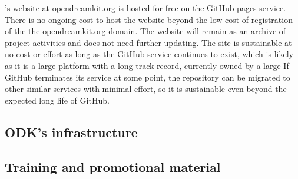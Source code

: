 \documentclass{deliverablereport}
\begin{document}
\ODK's website at opendreamkit.org is hosted for free on the GitHub-pages service.
There is no ongoing cost to host the website beyond the low cost of registration of the the opendreamkit.org domain.
The \ODK website will remain as an archive of project activities and does not need further updating.
The site is sustainable at no cost or effort as long as the GitHub service continues to exist,
which is likely as it is a large platform with a long track record, currently owned by a large
If GitHub terminates its service at some point,
the repository can be migrated to other similar services with minimal effort,
so it is sustainable even beyond the expected long life of GitHub.


\subsection{ODK's infrastructure}


\subsection{Training and promotional material}

\end{document}
